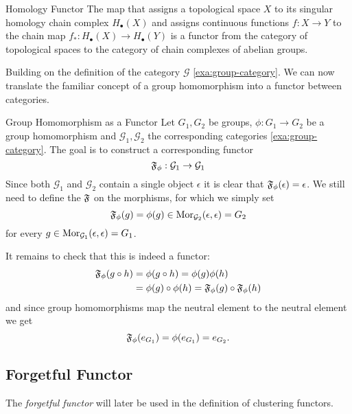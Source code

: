 \begin{example}{Homology Functor \cite[Chapter~2.3]{Hatcher2001}}{}
The map that assigns a topological space $X$ to its singular homology chain complex $H_\bullet(X)$ and assigns continuous functions $f: X \to Y$ to the chain map $f_*: H_\bullet(X) \to H_\bullet(Y)$ is a functor from the category of topological spaces to the category of chain complexes of abelian groups.
\end{example}

Building on the definition of the category $\mathcal{G}$ \ref{exa:group-category}. We can now translate the familiar concept of a group homomorphism into a functor between categories.

\begin{example}{Group Homomorphism as a Functor}{}
Let $G_1, G_2$ be groups, $\phi: G_1 \to G_2$ be a group homomorphism and $\mathcal{G}_1,\mathcal{G}_2$ the corresponding categories \ref{exa:group-category}. The goal is to construct a corresponding functor 
$$
\mathfrak{F}_\phi: \mathcal{G}_1 \to \mathcal{G}_1
$$
Since both $\mathcal{G}_1$ and $\mathcal{G}_2$ contain a single object $\epsilon$ it is clear that $\mathfrak{F}_\phi(\epsilon) = \epsilon$. We still need to define the $\mathfrak{F}$ on the morphisms, for which we simply set
$$
\mathfrak{F}_\phi(g) = \phi(g) \in \mathrm {Mor}_{\mathcal{G}_2}(\epsilon, \epsilon) = G_2
$$
for every $g \in \mathrm {Mor}_{\mathcal{G}_1}(\epsilon, \epsilon) = G_1$. \par

\medskip It remains to check that this is indeed a functor:
\begin{equation*}
\begin{split}
\mathfrak{F}_\phi(g \circ h) &= \phi(g \circ h) = \phi(g)\phi(h) \\
&= \phi(g) \circ \phi(h) = \mathfrak{F}_\phi(g) \circ \mathfrak{F}_\phi(h)
\end{split}
\end{equation*}
and since group homomorphisms map the neutral element to the neutral element we get
\begin{equation*}
\mathfrak{F}_\phi(e_{G_1}) = \phi(e_{G_1}) = e_{G_2}.
\end{equation*}
\end{example}

\subsection{Forgetful Functor}
The \emph{forgetful functor} will later be used in the definition of clustering functors.

